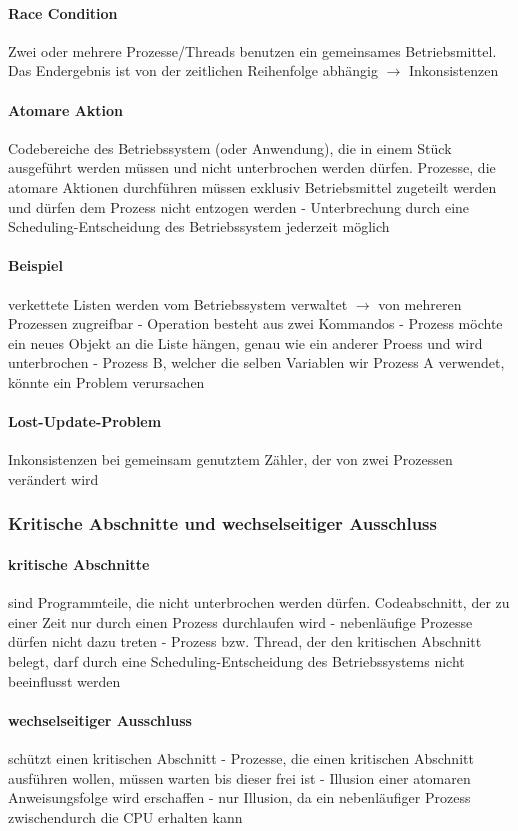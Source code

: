 \documentclass[11pt,a4paper,landscape]{article}
\begin{document}
\begin{multicols*}{3}
	\paragraph{Race Condition} Zwei oder mehrere Prozesse/Threads benutzen ein gemeinsames Betriebsmittel. Das Endergebnis ist von der zeitlichen Reihenfolge abhängig $\rightarrow$ Inkonsistenzen
	\paragraph{Atomare Aktion} Codebereiche des Betriebssystem (oder Anwendung), die in einem Stück ausgeführt werden müssen und nicht unterbrochen werden dürfen. Prozesse, die atomare Aktionen durchführen müssen exklusiv Betriebsmittel zugeteilt werden und dürfen dem Prozess nicht entzogen werden - Unterbrechung durch eine Scheduling-Entscheidung des Betriebssystem jederzeit möglich
	\paragraph{Beispiel} verkettete Listen werden vom Betriebssystem verwaltet $\rightarrow$ von mehreren Prozessen zugreifbar - Operation besteht aus zwei Kommandos - Prozess möchte ein neues Objekt an die Liste hängen, genau wie ein anderer Proess und wird unterbrochen - Prozess B, welcher die selben Variablen wir Prozess  A verwendet, könnte ein Problem verursachen
	\paragraph{Lost-Update-Problem} Inkonsistenzen bei gemeinsam genutztem Zähler, der von zwei Prozessen verändert wird
	\subsubsection{Kritische Abschnitte und wechselseitiger Ausschluss}
	\paragraph{kritische Abschnitte} sind Programmteile, die nicht unterbrochen werden dürfen. Codeabschnitt, der zu einer Zeit nur durch einen Prozess durchlaufen wird - nebenläufige Prozesse dürfen nicht dazu treten - Prozess bzw. Thread, der den kritischen Abschnitt belegt, darf durch eine Scheduling-Entscheidung des Betriebssystems nicht beeinflusst werden
	\paragraph{wechselseitiger Ausschluss} schützt einen kritischen Abschnitt - Prozesse, die einen kritischen Abschnitt ausführen wollen, müssen warten bis dieser frei ist - Illusion einer atomaren Anweisungsfolge wird erschaffen - nur Illusion, da ein nebenläufiger Prozess zwischendurch die CPU erhalten kann

\end{multicols*}
\end{document}
